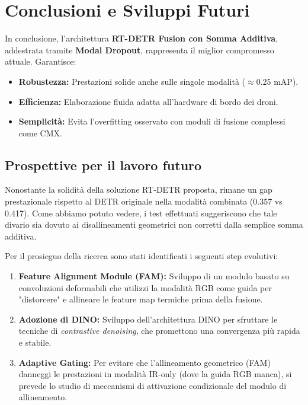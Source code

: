 \documentclass[a4paper,12pt]{article}
\begin{document}
\newpage

\section{Conclusioni e Sviluppi Futuri}

In conclusione, l'architettura \textbf{RT-DETR Fusion con Somma Additiva}, addestrata tramite \textbf{Modal Dropout}, rappresenta il miglior compromesso attuale. Garantisce:
\begin{itemize}
    \item \textbf{Robustezza:} Prestazioni solide anche sulle singole modalità ($\approx 0.25$ mAP).
    \item \textbf{Efficienza:} Elaborazione fluida adatta all'hardware di bordo dei droni.
    \item \textbf{Semplicità:} Evita l'overfitting osservato con moduli di fusione complessi come CMX.
\end{itemize}

\subsection*{Prospettive per il lavoro futuro}
Nonostante la solidità della soluzione RT-DETR proposta, rimane un gap prestazionale rispetto al DETR originale nella modalità combinata (0.357 vs 0.417). Come abbiamo potuto vedere, i test effettuati suggeriscono che tale divario sia dovuto ai disallineamenti geometrici non corretti dalla semplice somma additiva.

Per il prosieguo della ricerca sono stati identificati i seguenti step evolutivi:
\begin{enumerate}
    \item \textbf{Feature Alignment Module (FAM):} Sviluppo di un modulo basato su convoluzioni deformabili che utilizzi la modalità RGB come guida per "distorcere" e allineare le feature map termiche prima della fusione.
    \item \textbf{Adozione di DINO:} Sviluppo dell'architettura DINO \cite{dino} per sfruttare le tecniche di \textit{contrastive denoising}, che promettono una convergenza più rapida e stabile.
    \item \textbf{Adaptive Gating:} Per evitare che l'allineamento geometrico (FAM) danneggi le prestazioni in modalità IR-only (dove la guida RGB manca), si prevede lo studio di meccanismi di attivazione condizionale del modulo di allineamento.
\end{enumerate}
\end{document}

